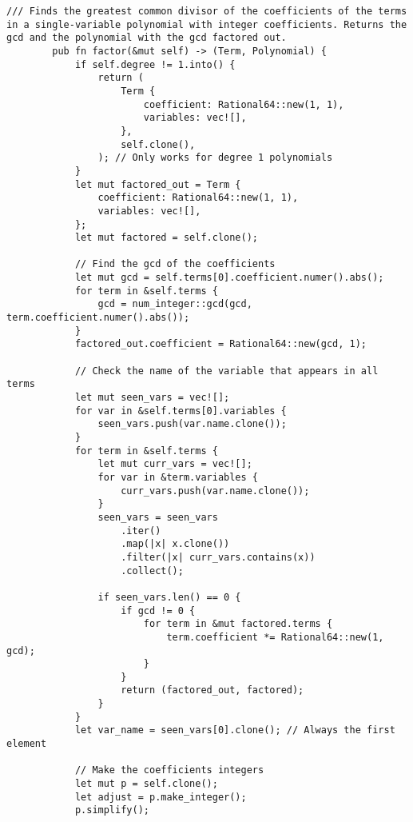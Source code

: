     \begin{lstlisting}[caption={The implementation of the \texttt{factor()} method for the \texttt{Polynomial} struct}, label={lst:polynomial-factor}]
        /// Finds the greatest common divisor of the coefficients of the terms in a single-variable polynomial with integer coefficients. Returns the gcd and the polynomial with the gcd factored out.
        pub fn factor(&mut self) -> (Term, Polynomial) {
            if self.degree != 1.into() {
                return (
                    Term {
                        coefficient: Rational64::new(1, 1),
                        variables: vec![],
                    },
                    self.clone(),
                ); // Only works for degree 1 polynomials
            }
            let mut factored_out = Term {
                coefficient: Rational64::new(1, 1),
                variables: vec![],
            };
            let mut factored = self.clone();

            // Find the gcd of the coefficients
            let mut gcd = self.terms[0].coefficient.numer().abs();
            for term in &self.terms {
                gcd = num_integer::gcd(gcd, term.coefficient.numer().abs());
            }
            factored_out.coefficient = Rational64::new(gcd, 1);

            // Check the name of the variable that appears in all terms
            let mut seen_vars = vec![];
            for var in &self.terms[0].variables {
                seen_vars.push(var.name.clone());
            }
            for term in &self.terms {
                let mut curr_vars = vec![];
                for var in &term.variables {
                    curr_vars.push(var.name.clone());
                }
                seen_vars = seen_vars
                    .iter()
                    .map(|x| x.clone())
                    .filter(|x| curr_vars.contains(x))
                    .collect();

                if seen_vars.len() == 0 {
                    if gcd != 0 {
                        for term in &mut factored.terms {
                            term.coefficient *= Rational64::new(1, gcd);
                        }
                    }
                    return (factored_out, factored);
                }
            }
            let var_name = seen_vars[0].clone(); // Always the first element

            // Make the coefficients integers
            let mut p = self.clone();
            let adjust = p.make_integer();
            p.simplify();


\end{lstlisting}
